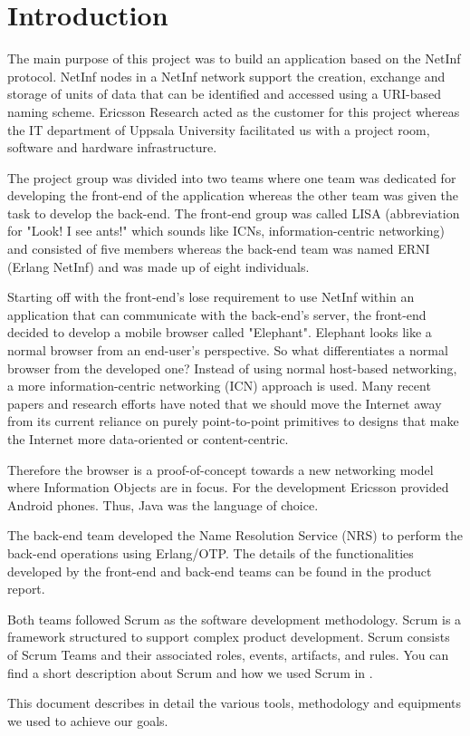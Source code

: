 \section{Introduction}
The main purpose of this project was to build an application based on the NetInf protocol. NetInf nodes in a NetInf network support the creation, exchange and storage of units of data that can be identified and accessed using a URI-based naming scheme. \cite{netinfproto} Ericsson Research acted as the customer for this project whereas the IT department of Uppsala University facilitated us with a project room, software and hardware infrastructure. 

The project group was divided into two teams where one team was dedicated for developing the front-end of the 
application whereas the other team was given the task to develop the back-end. The front-end group was called 
LISA (abbreviation for "Look! I see ants!" which sounds like ICNs, information-centric networking) and consisted of five members whereas 
the back-end team was named ERNI (Erlang NetInf) and was made up of eight individuals. 

Starting off with the front-end's lose requirement to use NetInf within an application that can communicate with
the back-end's server, the front-end decided to develop a mobile browser called "Elephant". Elephant looks like a normal browser from an end-user's perspective. So what differentiates a normal browser from the developed one? Instead of using normal host-based networking, a more information-centric networking (ICN) approach is used. Many recent papers and research efforts have noted that we should move the Internet away from its current reliance on purely point-to-point primitives to designs that make the Internet more data-oriented or content-centric. \cite{ghodsietal}  

Therefore the browser is a proof-of-concept towards a new networking model where Information Objects are in focus.
For the development Ericsson provided Android phones. Thus, Java was the language of choice.

The back-end team developed the Name Resolution Service (NRS) to perform the back-end operations using Erlang/OTP. The details of the functionalities developed 
by the front-end and back-end teams can be found in the product report. 

Both teams followed Scrum as the software development methodology. Scrum is a framework structured to support complex product development. Scrum consists of
Scrum Teams and their associated roles, events, artifacts, and rules. \cite{scrumpaper}
You can find a short description about Scrum and
how we used Scrum in .

This document describes in detail the various tools, methodology and equipments we used to achieve our goals. 
